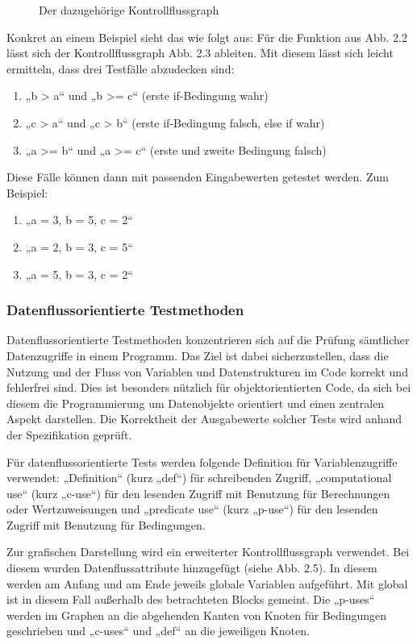 \documentclass[	%
		fontsize=11pt,  %
		a4paper,	    %
		ngerman,		%
		sans,			%
		f4,				%
	]{HsH-report}		%
\begin{document}
\begin{figure}
\begin{minipage}{0.49\textwidth}
		\caption{Der dazugehörige Kontrollflussgraph}
	\end{minipage}
\end{figure}

Konkret an einem Beispiel sieht das wie folgt aus: Für die Funktion aus Abb.
2.2 lässt sich der Kontrollflussgraph Abb. 2.3 ableiten. Mit diesem lässt sich
leicht ermitteln, dass drei Testfälle abzudecken sind:

\begin{enumerate}
	\item „b > a“ und „b >= c“ (erste if-Bedingung wahr)
	\item „c > a“ und „c > b“ (erste if-Bedingung falsch, else if wahr)
	\item „a >= b“ und „a >= c“ (erste und zweite Bedingung falsch)
\end{enumerate}

Diese Fälle können dann mit passenden Eingabewerten getestet werden. Zum
Beispiel:

\begin{enumerate}
	\item „a = 3, b = 5, c = 2“
	\item „a = 2, b = 3, c = 5“
	\item „a = 5, b = 3, c = 2“
\end{enumerate}

\subsubsection{Datenflussorientierte Testmethoden}
Datenflussorientierte Testmethoden konzentrieren sich auf die Prüfung
sämtlicher Datenzugriffe in einem Programm. Das Ziel ist dabei sicherzustellen,
dass die Nutzung und der Fluss von Variablen und Datenstrukturen im Code
korrekt und fehlerfrei sind. Dies ist besonders nützlich für objektorientierten
Code, da sich bei diesem die Programmierung um Datenobjekte orientiert und
einen zentralen Aspekt darstellen. Die Korrektheit der Ausgabewerte solcher
Tests wird anhand der Spezifikation geprüft. \cite{liggesmeyer:qualitaet}

Für datenflussorientierte Tests werden folgende Definition für
Variablenzugriffe verwendet: „Definition“ (kurz „def“) für schreibenden
Zugriff, „computational use“ (kurz „c-use“) für den lesenden Zugriff mit
Benutzung für Berechnungen oder Wertzuweisungen und „predicate use“ (kurz
„p-use“) für den lesenden Zugriff mit Benutzung für Bedingungen.
\cite{liggesmeyer:qualitaet}

Zur grafischen Darstellung wird ein erweiterter Kontrollflussgraph verwendet.
Bei diesem wurden Datenflussattribute hinzugefügt (siehe Abb. 2.5). In diesem
werden am Anfang und am Ende jeweils globale Variablen aufgeführt. Mit global
ist in diesem Fall außerhalb des betrachteten Blocks gemeint. Die „p-uses“
werden im Graphen an die abgehenden Kanten von Knoten für Bedingungen
geschrieben und „c-uses“ und „def“ an die jeweiligen Knoten.
\cite{liggesmeyer:qualitaet}
\end{document}
